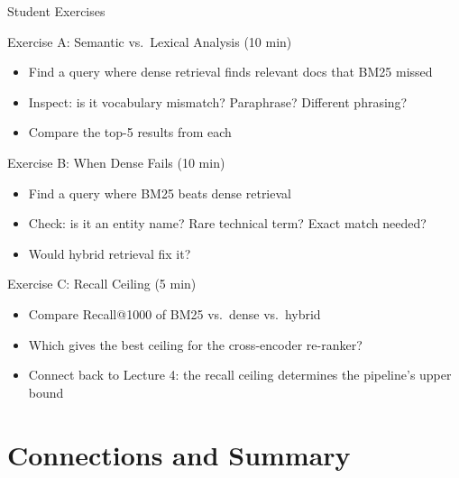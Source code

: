 \documentclass[aspectratio=169]{beamer}
\begin{document}
\begin{frame}{Student Exercises}
\begin{block}{Exercise A: Semantic vs.\ Lexical Analysis (10 min)}
\begin{itemize}
    \item Find a query where dense retrieval finds relevant docs that BM25 missed
    \item Inspect: is it vocabulary mismatch? Paraphrase? Different phrasing?
    \item Compare the top-5 results from each
\end{itemize}
\end{block}

\begin{block}{Exercise B: When Dense Fails (10 min)}
\begin{itemize}
    \item Find a query where BM25 beats dense retrieval
    \item Check: is it an entity name? Rare technical term? Exact match needed?
    \item Would hybrid retrieval fix it?
\end{itemize}
\end{block}

\begin{block}{Exercise C: Recall Ceiling (5 min)}
\begin{itemize}
    \item Compare Recall@1000 of BM25 vs.\ dense vs.\ hybrid
    \item Which gives the best ceiling for the cross-encoder re-ranker?
    \item Connect back to Lecture 4: the recall ceiling determines the pipeline's upper bound
\end{itemize}
\end{block}
\end{frame}

\section{Connections and Summary}

\begin{frame}[plain]
\sectionpage
\end{frame}
\end{document}
